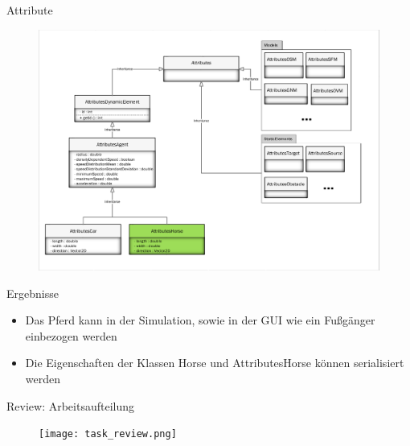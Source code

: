 \begin{frame}{Attribute}
	\begin{figure}
		\includegraphics[width=\textwidth, keepaspectratio]{appendix/uml/Attributes.pdf}
	\end{figure}
\end{frame}

\begin{frame}{Ergebnisse}
	\begin{itemize}
		\item	Das Pferd kann in der Simulation, sowie in der GUI wie ein Fußgänger einbezogen werden
		\item Die Eigenschaften der Klassen Horse und AttributesHorse können serialisiert werden
	\end{itemize}
\end{frame}

\begin{frame}{Review: Arbeitsaufteilung}
	\begin{figure}
		\texttt{[image: task\_review.png]}
	\end{figure}
\end{frame}
